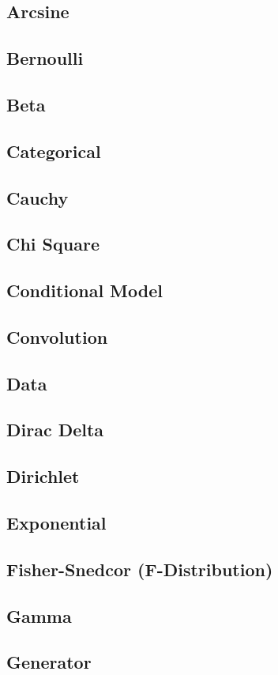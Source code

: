 \documentclass{article}
\begin{document}
\subsection{Arcsine}
\subsection{Bernoulli}
\subsection{Beta}
\subsection{Categorical}
\subsection{Cauchy}
\subsection{Chi Square}
\subsection{Conditional Model}
\subsection{Convolution}
\subsection{Data}
\subsection{Dirac Delta}
\subsection{Dirichlet}
\subsection{Exponential}
\subsection{Fisher-Snedcor (F-Distribution)}
\subsection{Gamma}
\subsection{Generator}
\end{document}
